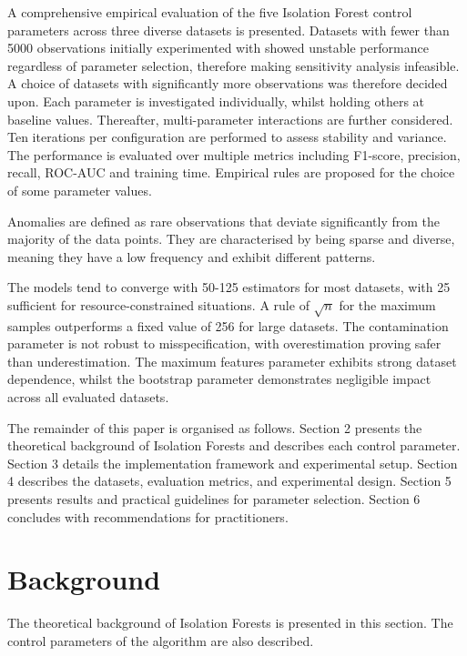 \documentclass[10pt, conference]{IEEEtran}
\begin{document}
A comprehensive empirical evaluation of the five Isolation Forest control parameters across three diverse datasets is presented. Datasets with fewer than 5000 observations initially experimented with showed unstable performance regardless of parameter selection, therefore making sensitivity analysis infeasible. A choice of datasets with significantly more observations was therefore decided upon. Each parameter is investigated individually, whilst holding others at baseline values. Thereafter, multi-parameter interactions are further considered. Ten iterations per configuration are performed to assess stability and variance. The performance is evaluated over multiple metrics including F1-score, precision, recall, ROC-AUC and training time. Empirical rules are proposed for the choice of some parameter values.  

Anomalies are defined as rare observations that deviate significantly from the majority of the data points. They are characterised by being sparse and diverse, meaning they have a low frequency and exhibit different patterns.

The models tend to converge with 50-125 estimators for most datasets, with 25 sufficient for resource-constrained situations. A rule of $\sqrt{n}$ for the maximum samples outperforms a fixed value of 256 for large datasets. The contamination parameter is not robust to misspecification, with overestimation proving safer than underestimation. The maximum features parameter exhibits strong dataset dependence, whilst the bootstrap parameter demonstrates negligible impact across all evaluated datasets.

The remainder of this paper is organised as follows. Section 2 presents the theoretical background of Isolation Forests and describes each control parameter. Section 3 details the implementation framework and experimental setup. Section 4 describes the datasets, evaluation metrics, and experimental design. Section 5 presents results and practical guidelines for parameter selection. Section 6 concludes with recommendations for practitioners.


\section{Background}
The theoretical background of Isolation Forests is presented in this section. The control parameters of the algorithm are also described.
\end{document}
